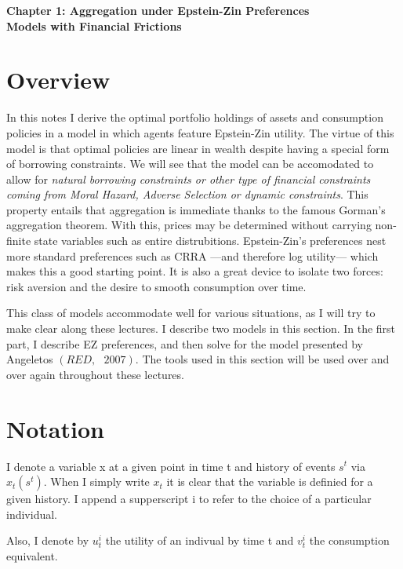 \documentclass{article}
\begin{document}
\begin{center}
\textbf{Chapter 1: Aggregation under Epstein-Zin Preferences \\[0pt]
Models with Financial Frictions}
\end{center}

\section{Overview}

In this notes I derive the optimal portfolio holdings of assets and
consumption policies in a model in which agents feature Epstein-Zin utility.
The virtue of this model is that optimal policies are linear in wealth
despite having a special form of borrowing constraints. We will see that the
model can be accomodated to allow for \textit{natural borrowing constraints
or other type of financial constraints coming from Moral Hazard, Adverse
Selection or dynamic constraints}. This property entails that aggregation is
immediate thanks to the famous Gorman's aggregation theorem. With this,
prices may be determined without carrying non-finite state variables such as
entire distrubitions. Epstein-Zin's preferences nest more standard
preferences such as CRRA ---and therefore log utility--- which makes this a
good starting point. It is also a great device to isolate two forces: risk
aversion and the desire to smooth consumption over time.

This class of models accommodate well for various situations, as I will try
to make clear along these lectures. I describe two models in this section.
In the first part, I describe EZ preferences, and then solve for the model
presented by Angeletos $\left( RED,\text{ }2007\right) $. The tools used in
this section will be used over and over again throughout these lectures.

\section{Notation}

I denote a variable x at a given point in time t and history of events $%
s^{t} $ via $x_{t}\left( s^{t}\right) .$ When I simply write $x_{t}$ it is
clear that the variable is definied for a given history. I append a
supperscript i to refer to the choice of a particular individual.

Also, I denote by $u_{t}^{i}$ the utility of an indivual by time t and $%
v_{t}^{i}$ the consumption equivalent.
\end{document}
